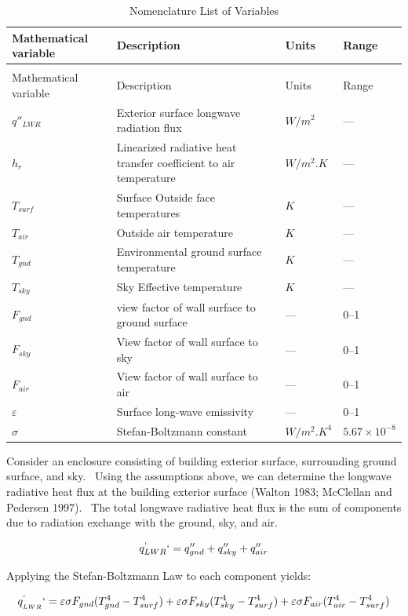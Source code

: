 \begin{longtable}[c]{p{1.0in}p{3.0in}p{1.0in}p{1.0in}}

\caption{Nomenclature List of Variables \label{table:nomenclature-list-of-variables}} \tabularnewline
\toprule 
Mathematical variable & Description & Units & Range \tabularnewline
\midrule
\endfirsthead

\caption[]{Nomenclature List of Variables} \tabularnewline
\toprule 
Mathematical variable & Description & Units & Range \tabularnewline
\midrule
\endhead

$q''_{LWR}$ & Exterior surface longwave radiation flux & $W/m^2$ & --- \tabularnewline
$h_r$ & Linearized radiative heat transfer coefficient to air temperature & $W/m^2.K$ & --- \tabularnewline
$T_{surf}$ & Surface Outside face temperatures & $K$ & --- \tabularnewline
$T_{air}$ & Outside air temperature & $K$ & --- \tabularnewline
$T_{gnd}$ & Environmental ground surface temperature & $K$ & --- \tabularnewline
$T_{sky}$ & Sky Effective temperature & $K$ & --- \tabularnewline
$F_{gnd}$ & view factor of wall surface to ground surface & --- & 0--1 \tabularnewline
$F_{sky}$ & View factor of wall surface to sky & --- & 0--1 \tabularnewline
$F_{air}$ & View factor of wall surface to air & --- & 0--1 \tabularnewline
$\varepsilon$ & Surface long-wave emissivity & --- & 0--1 \tabularnewline
$\sigma$ & Stefan-Boltzmann constant & $W/m^2.K^4$ & $5.67 \times 10^{-8}$ \tabularnewline
\bottomrule
\end{longtable}

Consider an enclosure consisting of building exterior surface, surrounding ground surface, and sky.~ Using the assumptions above, we can determine the longwave radiative heat flux at the building exterior surface (Walton 1983; McClellan and Pedersen 1997).~ The total longwave radiative heat flux is the sum of components due to radiation exchange with the ground, sky, and air.

\begin{equation}
q_{LWR}^`` = {q''_{gnd}} + {q''_{sky}} + {q''_{air}}
\end{equation}

Applying the Stefan-Boltzmann Law to each component yields:

\begin{equation}
q_{_{LWR}}^`` = \varepsilon \sigma {F_{gnd}}(T_{gnd}^4 - T_{surf}^4) + \varepsilon \sigma {F_{sky}}(T_{sky}^4 - T_{surf}^4) + \varepsilon \sigma {F_{air}}(T_{air}^4 - T_{surf}^4)
\end{equation}

